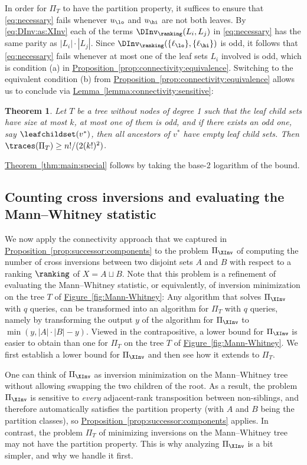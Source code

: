 \documentclass[11pt]{article}
\numberwithin{equation}{section}
\newtheorem{theorem}{Theorem}[section]
\theoremstyle{definition}
\theoremstyle{plain}
\newcommand{\expref}[2]{\hyperref[#2]{#1~\ref{#2}}}
\begin{document}
In order for $\Pi_T$ to have the partition property, it suffices to ensure that \eqref{eq:necessary} fails whenever $u_\lo$ and $u_\hi$ are not both leaves. By \eqref{eq:DInv:as:XInv} each of the terms $\DInv_\ranking(L_i,L_j)$ in \eqref{eq:necessary} has the same parity as $|L_i| \cdot |L_j|$. Since $\DInv_\ranking(\{\ell_\lo\},\{\ell_\hi\})$ is odd, it follows that \eqref{eq:necessary} fails whenever at most one of the leaf sets $L_i$ involved is odd, which is condition (a) in \expref{Proposition}{prop:connectivity:equivalence}. Switching to the equivalent condition (b) from \expref{Proposition}{prop:connectivity:equivalence} allows us to conclude via \expref{Lemma}{lemma:connectivity:sensitive}:
\begin{theorem}
Let $T$ be a tree without nodes of degree 1 such that the leaf child sets have size at most $k$, at most one of them is odd, and if there exists an odd one, say $\leafchildset(v^*)$, then all ancestors of $v^*$ have empty leaf child sets. Then $\traces(\Pi_T) \ge n!/(2(k!)^2)$.
\end{theorem}
\expref{Theorem}{thm:main:special} follows by taking the base-2 logarithm of the bound.

\subsection{Counting cross inversions and evaluating the Mann--Whitney statistic}
\label{sec:connectivity:cross-inversions}

We now apply the connectivity approach that we captured in \expref{Proposition}{prop:successor:components} to the problem $\Pi_{\XInv}$ of computing the number of cross inversions between two disjoint sets $A$ and $B$ with respect to a ranking $\ranking$ of $X = A \sqcup B$. Note that this problem is a refinement of evaluating the Mann--Whitney statistic, or equivalently, of inversion minimization on the tree $T$ of \expref{Figure}{fig:Mann-Whitney}: Any algorithm that solves $\Pi_{\XInv}$ with $q$ queries, can be transformed into an algorithm for $\Pi_T$ with $q$ queries, namely by transforming the output $y$ of the algorithm for $\Pi_{\XInv}$ to $\min(y,|A| \cdot |B|-y)$. Viewed in the contrapositive, a lower bound for $\Pi_{\XInv}$ is easier to obtain than one for $\Pi_T$ on the tree $T$ of \expref{Figure}{fig:Mann-Whitney}. We first establish a lower bound for $\Pi_{\XInv}$ and then see how it extends to $\Pi_T$.

One can think of $\Pi_{\XInv}$ as inversion minimization on the Mann--Whitney tree without allowing swapping the two children of the root. As a result, the problem $\Pi_{\XInv}$ is sensitive to \emph{every} adjacent-rank transposition between non-siblings, and therefore automatically satisfies the partition property (with $A$ and $B$ being the partition classes), so \expref{Proposition}{prop:successor:components} applies. In contrast, the problem $\Pi_T$ of minimizing inversions on the Mann--Whitney tree may not have the partition property. This is why analyzing $\Pi_{\XInv}$ is a bit simpler, and why we handle it first.
\end{document}
